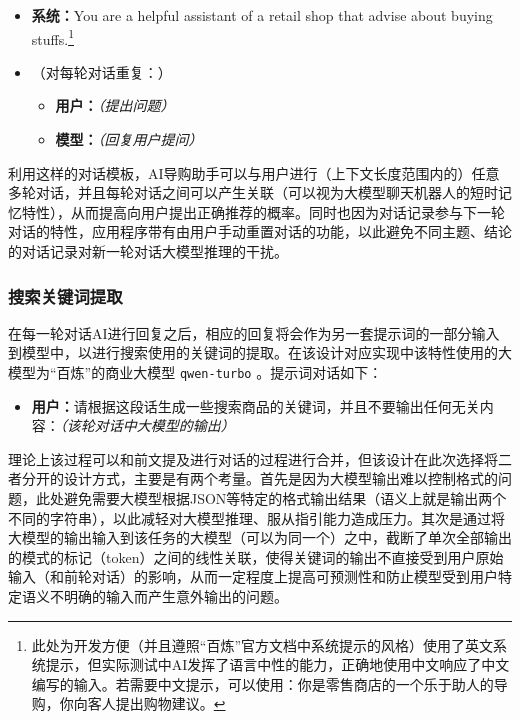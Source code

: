\begin{itemize}
    \item[] \textbf{系统：}You are a helpful assistant of a retail shop that advise about buying stuffs.\footnote{此处为开发方便（并且遵照“百炼”官方文档中系统提示的风格）使用了英文系统提示，但实际测试中AI发挥了语言中性的能力，正确地使用中文响应了中文编写的输入。若需要中文提示，可以使用：你是零售商店的一个乐于助人的导购，你向客人提出购物建议。}
    \item[] （对每轮对话重复：）
    \begin{itemize}
        \item[] \textbf{用户：}\textit{（提出问题）}
        \item[] \textbf{模型：}\textit{（回复用户提问）}
    \end{itemize}
\end{itemize}

利用这样的对话模板，AI导购助手可以与用户进行（上下文长度范围内的）任意多轮对话，并且每轮对话之间可以产生关联（可以视为大模型聊天机器人的短时记忆特性），从而提高向用户提出正确推荐的概率。同时也因为对话记录参与下一轮对话的特性，应用程序带有由用户手动重置对话的功能，以此避免不同主题、结论的对话记录对新一轮对话大模型推理的干扰。

\subsubsection{搜索关键词提取}

在每一轮对话AI进行回复之后，相应的回复将会作为另一套提示词的一部分输入到模型中，以进行搜索使用的关键词的提取。在该设计对应实现中该特性使用的大模型为“百炼”的商业大模型 \verb|qwen-turbo| 。提示词对话如下：

\begin{itemize}
    \item[] \textbf{用户：}请根据这段话生成一些搜索商品的关键词，并且不要输出任何无关内容：\textit{（该轮对话中大模型的输出）}
\end{itemize}

理论上该过程可以和前文提及进行对话的过程进行合并，但该设计在此次选择将二者分开的设计方式，主要是有两个考量。首先是因为大模型输出难以控制格式的问题，此处避免需要大模型根据JSON等特定的格式输出结果（语义上就是输出两个不同的字符串），以此减轻对大模型推理、服从指引能力造成压力。其次是通过将大模型的输出输入到该任务的大模型（可以为同一个）之中，截断了单次全部输出的模式的标记（token）之间的线性关联，使得关键词的输出不直接受到用户原始输入（和前轮对话）的影响，从而一定程度上提高可预测性和防止模型受到用户特定语义不明确的输入而产生意外输出的问题。

